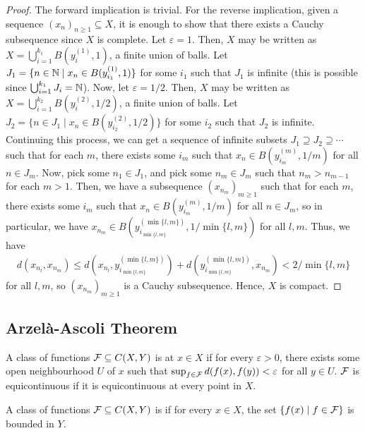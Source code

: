 \begin{proof}
    The forward implication is trivial. For the reverse implication, given a sequence $(x_{n})_{n \geq 1} \subseteq X$, it is enough to show that there exists a Cauchy subsequence since $X$ is complete. Let $\varepsilon = 1$. Then, $X$ may be written as $X = \bigcup_{i=1}^{k_{1}} B(y_{i}^{(1)},1)$, a finite union of balls. Let $J_{1} = \{n \in \mathbb{N} \mid x_{n} \in B(y_{i_{1}}^{(1)},1)\}$ for some $i_{1}$ such that $J_{1}$ is infinite (this is possible since $\bigcup_{i=1}^{k_{1}} J_{i} = \mathbb{N}$). Now, let $\varepsilon = 1/2$. Then, $X$ may be written as $X = \bigcup_{i=1}^{k_{2}} B(y_{i}^{(2)},1/2)$, a finite union of balls. Let $J_{2} = \{n \in J_{1} \mid x_{n} \in B(y_{i_{2}}^{(2)},1/2)\}$ for some $i_{2}$ such that $J_{2}$ is infinite. Continuing this process, we can get a sequence of infinite subsets $J_{1} \supseteq J_{2} \supseteq \cdots$ such that for each $m$, there exists some $i_{m}$ such that $x_{n} \in B(y_{i_{m}}^{(m)},1/m)$ for all $n \in J_{m}$. Now, pick some $n_{1} \in J_{1}$, and pick some $n_{m} \in J_{m}$ such that $n_{m} > n_{m-1}$ for each $m > 1$. Then, we have a subsequence $(x_{n_{m}})_{m \geq 1}$ such that for each $m$, there exists some $i_{m}$ such that $x_{n} \in B(y_{i_{m}}^{(m)},1/m)$ for all $n \in J_{m}$, so in particular, we have $x_{n_{m}} \in B(y_{i_{\min\{l,m\}}}^{(\min\{l,m\})}, 1/\min\{l,m\})$ for all $l,m$. Thus, we have
    \begin{align}
        d(x_{n_{l}},x_{n_{m}}) \leq d(x_{n_{l}},y_{i_{\min\{l,m\}}}^{(\min\{l,m\})}) + d(y_{i_{\min\{l,m\}}}^{(\min\{l,m\})},x_{n_{m}}) < 2/\min\{l,m\}
    \end{align}
    for all $l,m$, so $(x_{n_{m}})_{m \geq 1}$ is a Cauchy subsequence. Hence, $X$ is compact.
\end{proof}

\subsection{Arzelà-Ascoli Theorem}

\begin{definition}
    A class of functions $\mathcal{F} \subseteq C(X,Y)$ is  at $x \in X$ if for every $\varepsilon > 0$, there exists some open neighbourhood $U$ of $x$ such that $\sup_{f \in \mathcal{F}} d(f(x),f(y)) < \varepsilon$ for all $y \in U$. $\mathcal{F}$ is equicontinuous if it is equicontinuous at every point in $X$.
\end{definition}

\begin{definition}
    A class of functions $\mathcal{F} \subseteq C(X,Y)$ is  if for every $x \in X$, the set $\{f(x) \mid f \in \mathcal{F}\}$ is bounded in $Y$.
\end{definition}

